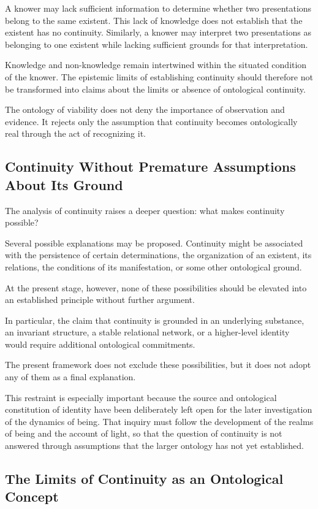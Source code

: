 A knower may lack sufficient information to determine whether two presentations belong to the same existent. This lack of knowledge does not establish that the existent has no continuity. Similarly, a knower may interpret two presentations as belonging to one existent while lacking sufficient grounds for that interpretation.

Knowledge and non-knowledge remain intertwined within the situated condition of the knower. The epistemic limits of establishing continuity should therefore not be transformed into claims about the limits or absence of ontological continuity.

The ontology of viability does not deny the importance of observation and evidence. It rejects only the assumption that continuity becomes ontologically real through the act of recognizing it.

\subsection{Continuity Without Premature Assumptions About Its Ground}

The analysis of continuity raises a deeper question: what makes continuity possible?

Several possible explanations may be proposed. Continuity might be associated with the persistence of certain determinations, the organization of an existent, its relations, the conditions of its manifestation, or some other ontological ground.

At the present stage, however, none of these possibilities should be elevated into an established principle without further argument.

In particular, the claim that continuity is grounded in an underlying substance, an invariant structure, a stable relational network, or a higher-level identity would require additional ontological commitments.

The present framework does not exclude these possibilities, but it does not adopt any of them as a final explanation.

This restraint is especially important because the source and ontological constitution of identity have been deliberately left open for the later investigation of the dynamics of being. That inquiry must follow the development of the realms of being and the account of light, so that the question of continuity is not answered through assumptions that the larger ontology has not yet established.

\subsection{The Limits of Continuity as an Ontological Concept}

